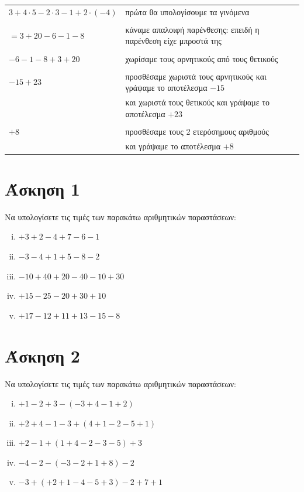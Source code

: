 \documentclass[a4paper,10pt]{report}
\begin{document}
\begin{table}[h]
\begin{tabular}{l|l}
$3+4\cdot5-2\cdot3-1+2\cdot(-4)$ & πρώτα θα υπολογίσουμε τα γινόμενα                                  \\
                                 &                                                                    \\
$= 3+20-6-1-8$                   & κάναμε απαλοιφή παρένθεσης: επειδή η παρένθεση είχε μπροστά της    \\
                                 &                                                                    \\
$-6-1-8+3+20$                    & χωρίσαμε τους αρνητικούς από τους θετικούς                         \\
                                 &                                                                    \\
$-15+23$                         & προσθέσαμε χωριστά τους αρνητικούς και γράψαμε το αποτέλεσμα $-15$ \\
                                 & και χωριστά τους θετικούς και γράψαμε το αποτέλεσμα $+23$          \\
                                 &                                                                    \\
$+8$                             & προσθέσαμε τους 2 ετερόσημους αριθμούς                             \\
                                 & και γράψαμε το αποτέλεσμα $+8$                                    
\end{tabular}
\end{table}

\section*{Άσκηση 1  \hfill \small{}}
Να υπολογίσετε τις τιμές των παρακάτω αριθμητικών παραστάσεων:
\begin{enumerate}[i)]
\item $+3+2-4+7-6-1$
\item $-3-4+1+5-8-2$
\item $-10+40+20-40-10+30$
\item $+15-25-20+30+10$
\item $+17-12+11+13-15-8$
\end{enumerate}


\section*{Άσκηση 2  \hfill \small{}}
Να υπολογίσετε τις τιμές των παρακάτω αριθμητικών παραστάσεων:
\begin{enumerate}[i)]
\item $+1-2+3-(-3+4-1+2)$
\item $+2+4-1-3+(4+1-2-5+1)$
\item $+2-1+(1+4-2-3-5)+3$
\item $-4-2-(-3-2+1+8)-2$
\item $-3+(+2+1-4-5+3)-2+7+1$
\end{enumerate}
\end{document}

